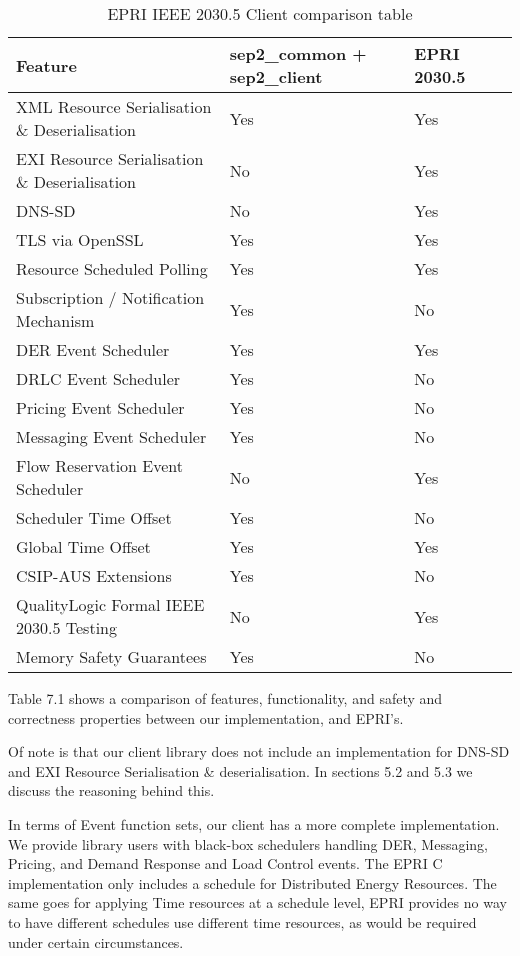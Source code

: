 \begin{table}[h]
	\centering
	\begin{tabular}{llll}
		\toprule
		\textbf{Feature} & \textbf{sep2\_common + sep2\_client} & \textbf{EPRI 2030.5}\\
		\midrule
		XML Resource Serialisation \& Deserialisation & Yes & Yes \\
		EXI Resource Serialisation \& Deserialisation & No  & Yes \\
		DNS-SD                                        & No  & Yes \\
		TLS via OpenSSL                               & Yes  & Yes \\
		Resource Scheduled Polling                    & Yes & Yes \\
		Subscription / Notification Mechanism         & Yes & No \\
		DER Event Scheduler                           & Yes & Yes \\
		DRLC Event Scheduler                          & Yes & No \\
		Pricing Event Scheduler                    	  & Yes & No \\
		Messaging Event Scheduler                     & Yes & No \\
		Flow Reservation Event Scheduler              & No  & Yes \\
		Scheduler Time Offset                         & Yes & No \\
		Global Time Offset                            & Yes & Yes \\
		CSIP-AUS Extensions                           & Yes & No \\
		QualityLogic Formal IEEE 2030.5 Testing       & No  & Yes \\
		Memory Safety Guarantees                      & Yes & No \\
		\bottomrule
	\end{tabular}
	\caption{EPRI IEEE 2030.5 Client comparison table}
	\label{tab:comparsiontable}
\end{table}

Table 7.1 shows a comparison of features, functionality, and safety and correctness properties between our implementation, and EPRI's.

Of note is that our client library does not include an implementation for DNS-SD and EXI Resource Serialisation \& deserialisation. In sections 5.2 and 5.3 we discuss the reasoning behind this.  

In terms of Event function sets, our client has a more complete implementation. We provide library users with black-box schedulers handling DER, Messaging, Pricing, and Demand Response and Load Control events. The EPRI C implementation only includes a schedule for Distributed Energy Resources. The same goes for applying Time resources at a schedule level, EPRI provides no way to have different schedules use different time resources, as would be required under certain circumstances.


